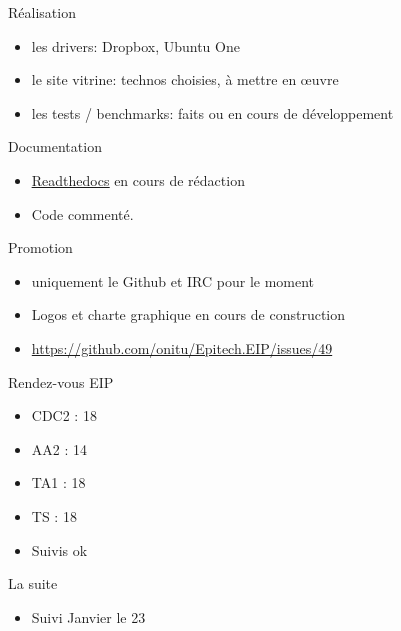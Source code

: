 \documentclass{beamer}
\begin{document}
\begin{frame}{Réalisation}
\begin{itemize}
  \item les drivers: Dropbox, Ubuntu One
  \item le site vitrine: technos choisies, à mettre en œuvre
  \item les tests / benchmarks: faits ou en cours de développement
\end{itemize}
\end{frame}

\begin{frame}{Documentation}
\begin{itemize}
  \item \underline{\hyperlink{http://onitu.readthedocs.org/en/latest/}{Readthedocs}} en cours de rédaction
  \item Code commenté.
\end{itemize}
\end{frame}

\begin{frame}{Promotion}
\begin{itemize}
  \item uniquement le Github et IRC pour le moment
  \item Logos et charte graphique en cours de construction
  \item \hyperlink{https://github.com/onitu/Epitech.EIP/issues/49}{https://github.com/onitu/Epitech.EIP/issues/49}
\end{itemize}
\end{frame}

\begin{frame}{Rendez-vous EIP}
\begin{itemize}
  \item CDC2 : 18
  \item AA2  : 14
  \item TA1  : 18
  \item TS   : 18
  \item Suivis ok
\end{itemize}
\end{frame}

\begin{frame}{La suite}
\begin{itemize}
  \item Suivi Janvier le 23
\end{itemize}
\end{frame}
\end{document}
